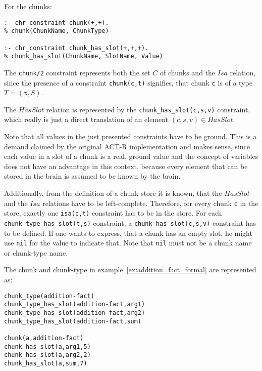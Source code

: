For the chunks:

\begin{lstlisting}
:- chr_constraint chunk(+,+).
% chunk(ChunkName, ChunkType)

:- chr_constraint chunk_has_slot(+,+,+).
% chunk_has_slot(ChunkName, SlotName, Value)
\end{lstlisting}

The \verb|chunk/2| constraint represents both the set $C$ of chunks and the $Isa$ relation, since the presence of a constraint \verb|chunk(c,t)| signifies, that chunk \verb|c| is of a type $T = (\mathtt{t},S)$.

The $HasSlot$ relation is represented by the \verb|chunk_has_slot(c,s,v)| constraint, which really is just a direct translation of an element $(c,s,v) \in HasSlot$.

Note that all values in the just presented constraints have to be ground. This is a demand claimed by the original ACT-R implementation and makes sense, since each value in a slot of a chunk is a real, ground value and the concept of variables does not have an advantage in this context, because every element that can be stored in the brain is assumed to be known by the brain.

Additionally, from the definition of a chunk store it is known, that the $HasSlot$ and the $Isa$ relations have to be left-complete.  Therefore, for every chunk \verb|c| in the store, exactly one \verb|isa(c,t)| constraint has to be in the store. For each \verb|chunk_type_has_slot(t,s)| constraint, a \verb|chunk_has_slot(c,s,v)| constraint has to be defined. If one wants to express, that a chunk has an empty slot, he might use \verb|nil| for the value to indicate that. Note that \verb|nil| must not be a chunk name or chunk-type name.

\begin{example}
\label{ex:addition_fact_chr}
The chunk and chunk-type in example~\ref{ex:addition_fact_formal} are represented as:

\begin{lstlisting}
chunk_type(addition-fact)
chunk_type_has_slot(addition-fact,arg1)
chunk_type_has_slot(addition-fact,arg2)
chunk_type_has_slot(addition-fact,sum)

chunk(a,addition-fact)
chunk_has_slot(a,arg1,5)
chunk_has_slot(a,arg2,2)
chunk_has_slot(a,sum,7)
\end{lstlisting}
\end{example}


